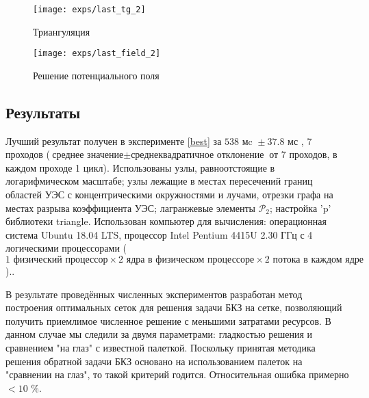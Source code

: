 \begin{figure}[H]
\texttt{[image: exps/last\_tg\_2]}
\caption{Триангуляция}
\end{figure}

\begin{figure}[H]
\texttt{[image: exps/last\_field\_2]}
\caption{Решение потенциального поля}
\end{figure}


\subsection{Результаты}

Лучший результат получен в эксперименте \ref{best} за ${538 \text{ мc } \pm 37.8 \text{ мс }}$, 7 проходов
(${\text{среднее значение} \pm \text{среднеквадратичное отклонение}}$ от 7 проходов, в каждом проходе 1 цикл). Использованы узлы, равноотстоящие в логарифмическом масштабе; узлы лежащие в местах пересечений границ областей УЭС с концентрическими окружностями и лучами, отрезки графа на местах разрыва коэффициента УЭС; лагранжевые элементы ${\mathcal{P}_2}$; настройка 'p' библиотеки triangle. Использован компьютер для вычисления: операционная система Ubuntu 18.04 LTS, процессор Intel Pentium 4415U 2.30 ГГц с 4 логическими процессорами ($1 \text{ физический процессор} \times 2 \text{ ядра в физическом процессоре} \times 2 \text{ потока в каждом ядре}$)..

В результате проведённых численных экспериментов разработан метод построения оптимальных сеток для решения задачи БКЗ на сетке, позволяющий получить приемлимое численное решение с меньшими затратами ресурсов. В данном случае мы следили за двумя параметрами: гладкостью решения и сравнением "на глаз" с известной палеткой. Поскольку принятая методика решения обратной задачи БКЗ основано на использованием палеток на "сравнении на глаз", то такой критерий годится. Относительная ошибка примерно ${<10}$ \%.

\clearpage